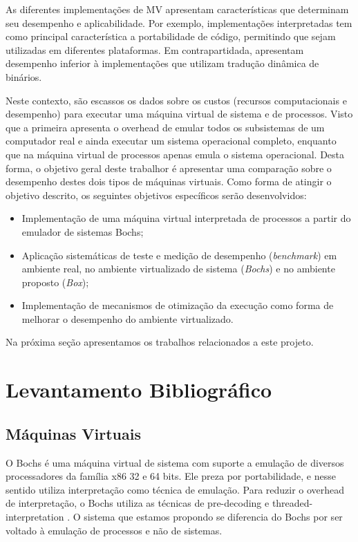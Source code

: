 \documentclass[11pt,twoside]{article}
\begin{document}
As diferentes implementações de MV apresentam características que determinam seu desempenho e aplicabilidade.
Por exemplo, implementações interpretadas tem como principal característica a portabilidade de código, permitindo que sejam utilizadas em diferentes plataformas. 
Em contrapartidada, apresentam desempenho inferior à implementações que utilizam tradução dinâmica de binários.

Neste contexto, são escassos os dados sobre os custos (recursos computacionais e desempenho) para executar uma máquina virtual de sistema e de processos. 
Visto que a primeira apresenta o overhead de emular todos os subsistemas de um computador real e ainda executar um sistema operacional completo, enquanto que na máquina virtual de processos apenas emula o sistema operacional.
Desta forma, o objetivo geral deste trabalhor é apresentar uma comparação sobre o desempenho destes dois tipos de máquinas virtuais.
Como forma de atingir o objetivo descrito, os seguintes objetivos específicos serão desenvolvidos:

\begin{itemize}
 \item Implementação de uma máquina virtual interpretada de processos a partir do emulador de sistemas Bochs;
 \item Aplicação sistemáticas de teste e medição de desempenho (\emph{benchmark}) em ambiente real, no ambiente virtualizado de sistema (\emph{Bochs}) e no ambiente proposto (\emph{Box});
 \item Implementação de mecanismos de otimização da execução como forma de melhorar o desempenho do ambiente virtualizado.
\end{itemize} 

Na próxima seção apresentamos os trabalhos relacionados a este projeto.


\section{Levantamento Bibliográfico}

\subsection{Máquinas Virtuais}
O Bochs \cite{bochs} é uma máquina virtual de sistema com suporte a emulação
de diversos processadores da família x86 32 e 64 bits. Ele preza
por portabilidade, e nesse sentido utiliza interpretação como técnica
de emulação. Para reduzir o overhead de interpretação, o Bochs utiliza
as técnicas de pre-decoding \cite{smith} e threaded-interpretation \cite{smith}.
O sistema que estamos propondo se diferencia do Bochs por ser voltado
à emulação de processos e não de sistemas.
\end{document}
